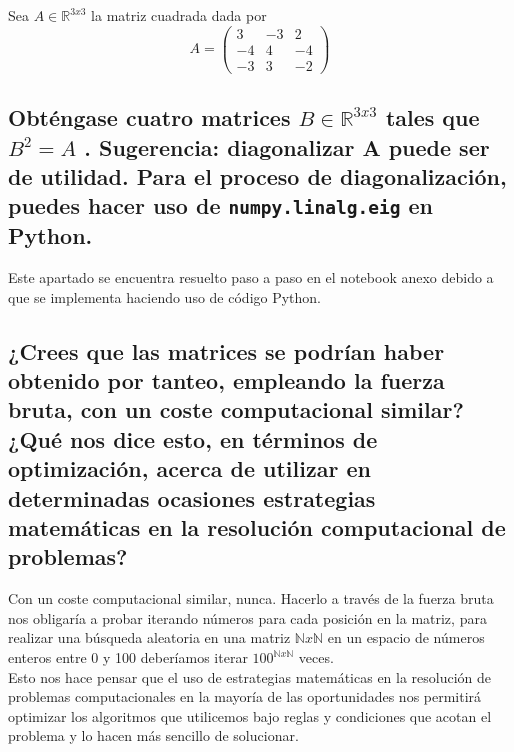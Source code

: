 \documentclass[../main.tex]{subfiles}
\begin{document}
Sea $A \in \mathbb R^{3x3}$ la matriz cuadrada dada por
\begin{equation*}
    A = 
    \begin{pmatrix}
        3 & -3 & 2\\
        -4 & 4 & -4\\
        -3 & 3 & -2
    \end{pmatrix}
\end{equation*}

\subsection{Obténgase cuatro matrices $B \in \mathbb R^{3x3}$ tales que $B^{2} = A$ .
Sugerencia: diagonalizar A puede ser de utilidad. Para el proceso de diagonalización,
puedes hacer uso de \texttt{numpy.linalg.eig} en Python.}

Este apartado se encuentra resuelto paso a paso en el notebook anexo debido a que se implementa haciendo uso de código Python.

\subsection{¿Crees que las matrices se podrían haber obtenido por tanteo, empleando la fuerza bruta,
con un coste computacional similar? ¿Qué nos dice esto, en términos de optimización,
acerca de utilizar en determinadas ocasiones estrategias matemáticas en la resolución
computacional de problemas?}

Con un coste computacional similar, nunca. Hacerlo a través de la fuerza bruta nos obligaría a probar iterando números para cada posición en la matriz, para realizar una búsqueda aleatoria en una matriz $ \mathbb N x \mathbb N $ en un espacio de números enteros entre 0 y 100 deberíamos iterar $ 100^{ \mathbb N x \mathbb N} $ veces.\\

Esto nos hace pensar que el uso de estrategias matemáticas en la resolución de problemas computacionales en la mayoría de las oportunidades nos permitirá optimizar los algoritmos que utilicemos bajo reglas y condiciones que acotan el problema y lo hacen más sencillo de solucionar.

\bigskip
\end{document}
